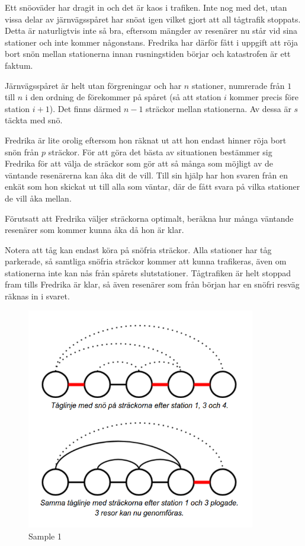 Ett snöoväder har dragit in och det är kaos i trafiken.
Inte nog med det, utan vissa delar av järnvägsspåret har snöat igen vilket gjort att all tågtrafik stoppats.
Detta är naturligtvis inte så bra, eftersom mängder av resenärer nu står vid sina stationer och inte kommer någonstans.
Fredrika har därför fått i uppgift att röja bort snön mellan stationerna innan rusningstiden börjar och katastrofen är ett faktum.

Järnvägsspåret är helt utan förgreningar och har $n$ stationer, numrerade från $1$ till $n$ i den ordning de förekommer på spåret (så att station $i$ kommer precis före station $i+1$).
Det finns därmed $n - 1$ sträckor mellan stationerna.
Av dessa är $s$ täckta med snö.

Fredrika är lite orolig eftersom hon räknat ut att hon endast hinner röja bort snön från $p$ sträckor.
För att göra det bästa av situationen bestämmer sig Fredrika för att välja de sträckor som gör att så många som möjligt av de väntande resenärerna kan åka dit de vill.
Till sin hjälp har hon svaren från en enkät som hon skickat ut till alla som väntar, där de fått svara på vilka stationer de vill åka mellan.

Förutsatt att Fredrika väljer sträckorna optimalt, beräkna hur många väntande resenärer som kommer kunna åka då hon är klar.

Notera att tåg kan endast köra på snöfria sträckor. Alla stationer har tåg parkerade, så samtliga snöfria sträckor kommer att kunna trafikeras, även om stationerna inte kan nås från spårets slutstationer. Tågtrafiken är helt stoppad fram tills Fredrika är klar, så även resenärer som från början har en snöfri resväg räknas in i svaret.

\begin{figure}
	\centering
\includegraphics[width=10cm]{snokaos.png}
\caption{Sample 1}
\end{figure} 

